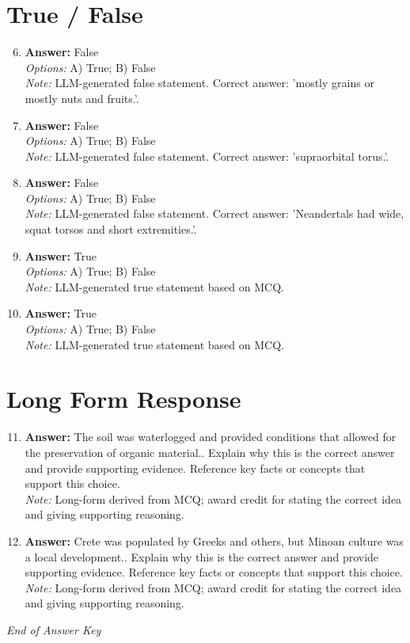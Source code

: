 \documentclass[12pt]{article}
\begin{document}
\section*{True / False}
\begin{enumerate}[label=\arabic*.]
\setcounter{enumi}{5}
\item \textbf{Answer:} False
\\ \textit{Options:} A) True; B) False
\\ \textit{Note:} LLM-generated false statement. Correct answer: 'mostly grains or mostly nuts and fruits.'.
\item \textbf{Answer:} False
\\ \textit{Options:} A) True; B) False
\\ \textit{Note:} LLM-generated false statement. Correct answer: 'supraorbital torus.'.
\item \textbf{Answer:} False
\\ \textit{Options:} A) True; B) False
\\ \textit{Note:} LLM-generated false statement. Correct answer: 'Neandertals had wide, squat torsos and short extremities.'.
\item \textbf{Answer:} True
\\ \textit{Options:} A) True; B) False
\\ \textit{Note:} LLM-generated true statement based on MCQ.
\item \textbf{Answer:} True
\\ \textit{Options:} A) True; B) False
\\ \textit{Note:} LLM-generated true statement based on MCQ.
\end{enumerate}

\section*{Long Form Response}
\begin{enumerate}[label=\arabic*.]
\setcounter{enumi}{10}
\item \textbf{Answer:} The soil was waterlogged and provided conditions that allowed for the preservation of organic material.. Explain why this is the correct answer and provide supporting evidence. Reference key facts or concepts that support this choice.
\\ \textit{Note:} Long-form derived from MCQ; award credit for stating the correct idea and giving supporting reasoning.
\item \textbf{Answer:} Crete was populated by Greeks and others, but Minoan culture was a local development.. Explain why this is the correct answer and provide supporting evidence. Reference key facts or concepts that support this choice.
\\ \textit{Note:} Long-form derived from MCQ; award credit for stating the correct idea and giving supporting reasoning.
\end{enumerate}

\vfill
\noindent\textit{End of Answer Key}
\end{document}
